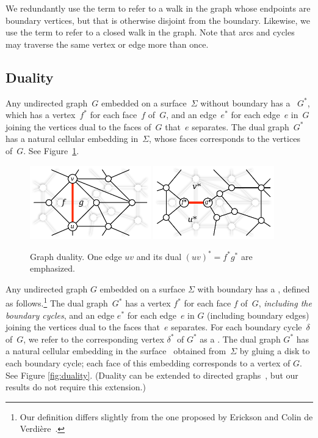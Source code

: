 \documentclass[letterpaper,review]{siamart190516}
\begin{document}
We redundantly use the term  to refer to a walk in the graph whose endpoints are boundary vertices, but that is otherwise disjoint from the boundary.  Likewise, we use the term  to refer to a closed walk in the graph.  Note that arcs and cycles may traverse the same vertex or edge more than once.

\subsection{Duality}

Any undirected graph~$G$ embedded on a surface~$\Sigma$ without boundary has a
~$G^*$, which has a vertex~$f^*$ for each face~$f$ of~$G$,
and an edge~$e^*$ for each edge~$e$ in~$G$ joining the vertices dual to the
faces of~$G$ that~$e$ separates. The dual graph~$G^*$ has a natural cellular
embedding in~$\Sigma$, whose faces corresponds to the vertices of~$G$.
See Figure~\ref{fig:prelims_primaldual}.

\begin{figure}[ht]
\centering
\includegraphics[height=1.25in]{Fig/primal}\quad
\includegraphics[height=1.25in]{Fig/dual}
\caption{Graph duality.  One edge $uv$ and its dual $(uv)^* =
f^*g^*$ are emphasized.} \label{fig:prelims_primaldual}
\end{figure}


Any undirected graph $G$ embedded on a surface $\Sigma$ with boundary has a , defined as follows.\footnote{Our definition differs slightly from the one proposed by Erickson and Colin de Verdière~\cite{ce-tnpcs-10}.}  The dual graph~$G^*$ has a vertex $f^*$ for each face $f$ of~$G$, \emph{including the boundary cycles}, and an edge $e^*$ for each edge~$e$ in $G$ (including boundary edges) joining the vertices dual to the faces that~$e$ separates.  For each boundary cycle~$\delta$ of~$G$, we refer to the corresponding vertex $\delta^*$ of $G^*$ as a .  The dual graph $G^*$ has a natural cellular embedding in the surface~\EMPH{$\Sigma^\bullet$} obtained from~$\Sigma$ by gluing a disk to each boundary cycle; each face of this embedding corresponds to a vertex of $G$.  See Figure \ref{fig:duality}.  (Duality can be extended to directed graphs~\cite{cen-hfcc-12}, but our results do not require this extension.)
\end{document}
